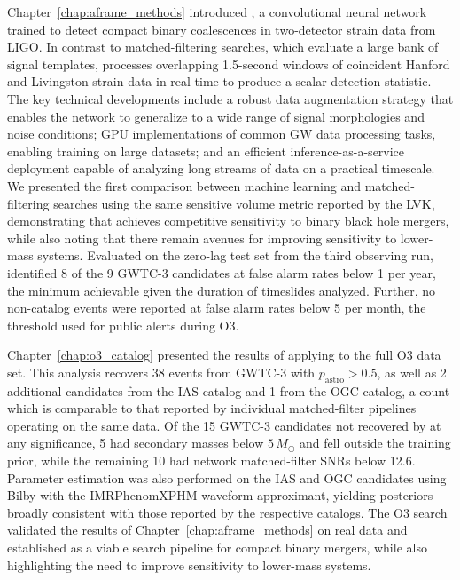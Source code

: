 Chapter~\ref{chap:aframe_methods} introduced \aframe, a convolutional neural network trained to detect compact binary coalescences in two-detector strain data from LIGO.
In contrast to matched-filtering searches, which evaluate a large bank of signal templates, \aframe processes overlapping 1.5-second windows of coincident Hanford and Livingston strain data in real time to produce a scalar detection statistic.
The key technical developments include a robust data augmentation strategy that enables the network to generalize to a wide range of signal morphologies and noise conditions; GPU implementations of common GW data processing tasks, enabling training on large datasets; and an efficient inference-as-a-service deployment capable of analyzing long streams of data on a practical timescale.
We presented the first comparison between machine learning and matched-filtering searches using the same sensitive volume metric reported by the LVK, demonstrating that \aframe achieves competitive sensitivity to binary black hole mergers, while 
also noting that there remain avenues for improving sensitivity to lower-mass systems.
Evaluated on the zero-lag test set from the third observing run, \aframe identified 8 of the 9 GWTC-3 candidates at false alarm rates below 1 per year, the minimum achievable given the duration of timeslides analyzed.
Further, no non-catalog events were reported at false alarm rates below 5 per month, the threshold used for public alerts during O3.

Chapter~\ref{chap:o3_catalog} presented the results of applying \aframe to the full O3 data set.
This analysis recovers 38 events from GWTC-3 with $p_\mathrm{astro} > 0.5$, as well as 2 additional candidates from the IAS catalog and 1 from the OGC catalog, a count which is comparable to that reported by individual matched-filter pipelines operating on the same data.
Of the 15 GWTC-3 candidates not recovered by \aframe at any significance, 5 had secondary masses below $5\,M_\odot$ and fell outside the training prior, while the remaining 10 had network matched-filter SNRs below 12.6.
Parameter estimation was also performed on the IAS and OGC candidates using Bilby with the IMRPhenomXPHM waveform approximant, yielding posteriors broadly consistent with those reported by the respective catalogs.
The O3 search validated the results of Chapter~\ref{chap:aframe_methods} on real data and established \aframe as a viable search pipeline for compact binary mergers, while also highlighting the need to improve sensitivity to lower-mass systems.

